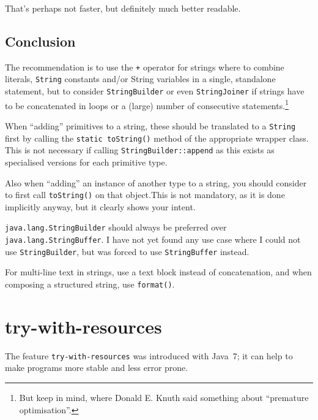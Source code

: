 That's perhaps not faster, but definitely much better readable.


\subsection{Conclusion}
The recommendation is to use the \verb#+# operator for strings where to combine literals, \lstinline|String| constants and/or String variables in a single, standalone statement, but to consider \lstinline|StringBuilder| or even \lstinline|StringJoiner| if strings have to be concatenated in loops or a (large) number of consecutive statements.\footnote{But keep \autocite{Knuth:PrematureOptimization} in mind, where Donald E. Knuth said something about “premature optimisation”.}

When “adding” primitives to a string, these should be translated to a \lstinline|String| first by calling the \lstinline|static toString()| method of the appropriate wrapper class. This is not necessary if calling \lstinline|StringBuilder::append| as this exists as specialised versions for each primitive type.

Also when “adding” an instance of another type to a string, you should consider to first call \lstinline|toString()| on that object.This is not mandatory, as it is done implicitly anyway, but it clearly shows your intent.

\lstinline|java.lang.StringBuilder| should always be preferred over \lstinline|java.lang.StringBuffer|. I have not yet found any use case where I could not use \lstinline|StringBuilder|, but was forced to use \lstinline|StringBuffer| instead.

For multi-line text in strings, use a text block instead of concatenation, and when composing a structured string, use \lstinline|format()|.


\section{try-with-resources}\label{sec:TryWithResources}
The feature \verb#try-with-resources#\autocite{ORACLE_DOC_LANGUAGE_SPECIFICATION:TryWithResources} was introduced with Java~7; it can help to make programs more stable and less error prone.







